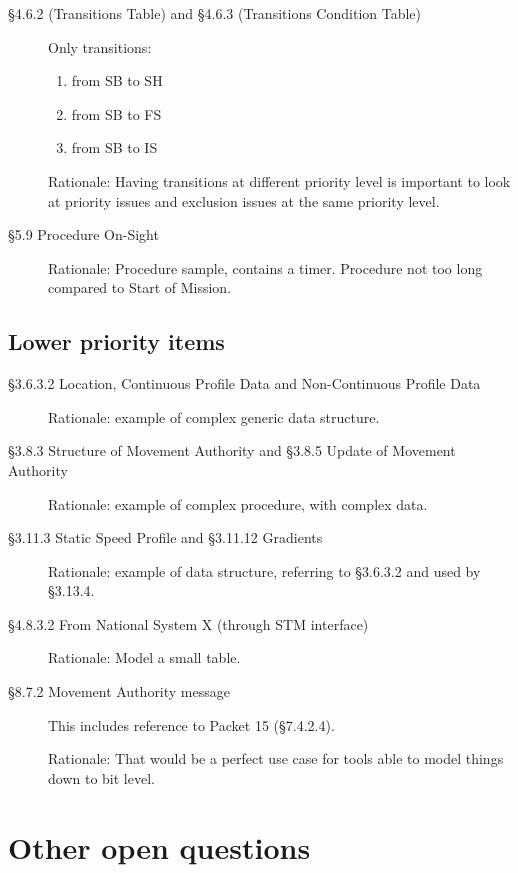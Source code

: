 \documentclass{template/openetcs_article}
\begin{document}
\begin{description}
\item [§4.6.2 (Transitions Table) and §4.6.3 (Transitions Condition
  Table)] Only transitions:
  \begin{enumerate}
  \item from SB to SH
  \item from SB to FS
  \item from SB to IS
  \end{enumerate}

  Rationale: Having transitions at different priority level is
  important to look at priority issues and exclusion issues at the
  same priority level.

\item [§5.9 Procedure On-Sight]

 Rationale: Procedure sample, contains a timer. Procedure not too long
 compared to Start of Mission.

\end{description}

\subsection{Lower priority items}

\begin{description}
\item [§3.6.3.2 Location, Continuous Profile Data and Non-Continuous
  Profile Data]

  Rationale: example of complex generic data structure.

\item [§3.8.3 Structure of Movement Authority and §3.8.5 Update of
  Movement Authority]

  Rationale: example of complex procedure, with complex data.

\item [§3.11.3 Static Speed Profile and §3.11.12 Gradients]

  Rationale: example of data structure, referring to §3.6.3.2 and used
  by §3.13.4.

\item [§4.8.3.2 From National System X (through STM interface)]

  Rationale: Model a small table. 

\item [§8.7.2 Movement Authority message] This includes reference to
  Packet 15 (§7.4.2.4). 

  Rationale: That would be a perfect use case for tools able to model
  things down to bit level.
\end{description}

\section{Other open questions}


\end{document}
